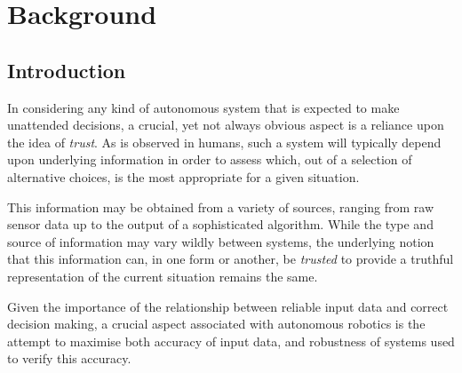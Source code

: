 \section{Background}

\subsection{Introduction}

%

 In considering any kind of autonomous system that is expected to make unattended decisions, a crucial, yet not always obvious aspect is a reliance upon the idea of \textit{trust}. As is observed in humans, such a system will typically depend upon underlying information in order to assess which, out of a selection of alternative choices, is the most appropriate for a given situation.
 
 This information may be obtained from a variety of sources, ranging from raw sensor data up to the output of a sophisticated algorithm. While the type and source of information may vary wildly between systems, the underlying notion that this information can, in one form or another, be \textit{trusted} to provide a truthful representation of the current situation remains the same. 
 
Given the importance of the relationship between reliable input data and correct decision making, a crucial aspect associated with autonomous robotics is the attempt to maximise both accuracy of input data, and robustness of systems used to verify this accuracy.

